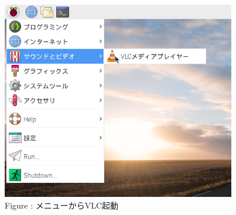 \documentclass[a4paper,12pt]{jarticle}
\begin{document}
\begin{figure}[hb]
  \centering
  \begin{minipage}{10.917cm}
    {\upshape
      \includegraphics[width=10.232cm,height=8.715cm]{textbook-img113.png}
      \newline
      Figure : メニューからVLC起動}
  \end{minipage}
\end{figure}
\clearpage
\end{document}
